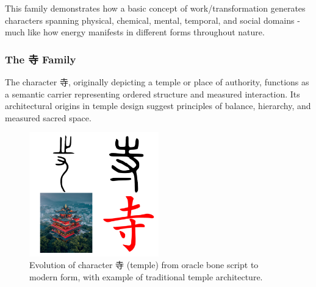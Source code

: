 \documentclass[11pt,letterpaper]{article}
\begin{document}
This family demonstrates how a basic concept of work/transformation
generates characters spanning physical, chemical, mental, temporal, and
social domains - much like how energy manifests in different forms
throughout nature.

\subsubsection{The 寺 Family}\label{the-ux5bfa-family}

The character 寺, originally depicting a temple or place of authority,
functions as a semantic carrier representing ordered structure and
measured interaction. Its architectural origins in temple design suggest
principles of balance, hierarchy, and measured sacred space.


\begin{figure}
  \centering
  \includegraphics[width=0.5\textwidth]{./images/zi_temple.png}
  \caption{Evolution of character 寺 (temple) from oracle bone script to
  modern form, with example of traditional temple architecture.}
\end{figure}
\end{document}
